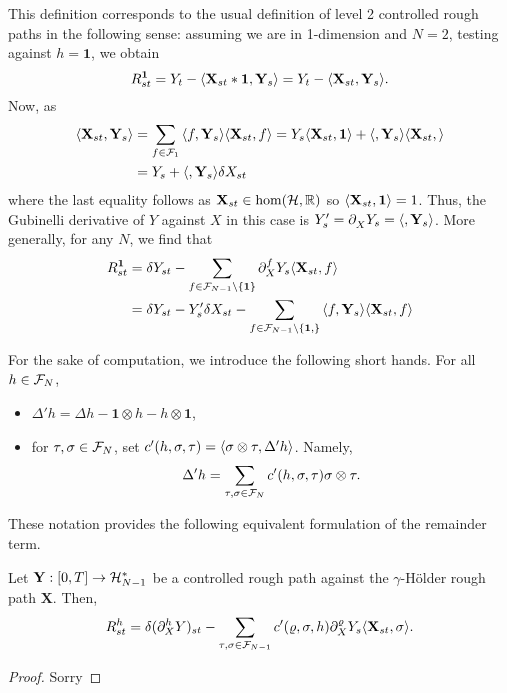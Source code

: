 \documentclass[11pt]{style/preprint}
\begin{document}
This definition corresponds to the usual definition of level 2 controlled rough paths in the following sense: 
assuming we are in 1-dimension and \(N = 2\), testing against \(h = \mathbf{1}\), we obtain
\[R^{\mathbf{1}}_{st} = Y_t - \< \mathbf{X}_{st} * \mathbf{1}, \mathbf{Y}_s\> 
  = Y_t - \< \mathbf{X}_{st}, \mathbf{Y}_s\>.\]
Now, as 
\begin{align*}
  \< \mathbf{X}_{st}, \mathbf{Y}_s\> 
  & = \sum_{f \in \CF_{1}} \< f, \mathbf{Y}_s\> \< \mathbf{X}_{st}, f\>
    = Y_s \< \mathbf{X}_{st}, \mathbf{1}\> 
      + \< \tree<X'>, \mathbf{Y}_s\> \< \mathbf{X}_{st}, \tree<X'>\>\\
  & = Y_s + \< \tree<X'>, \mathbf{Y}_s\> \delta X_{st}
\end{align*}
where the last equality follows as \(\mathbf{X}_{st} \in \hom({\mathcal H}, \mathbb{R})\) so 
\(\< \mathbf{X}_{st}, \mathbf{1}\> = 1\). Thus, the Gubinelli derivative of \(Y\) against 
\(X\) in this case is \(Y'_s = \partial^{\tree<X'>}_X Y_s = \< \tree<X'>, \mathbf{Y}_s\>\). 
More generally, for any \(N\), we find that
\begin{align*}
  R^{\mathbf{1}}_{st} 
  & = \delta Y_{st} - 
  \sum_{f \in \CF_{N - 1} \setminus \{\mathbf{1}\}} \partial_X^f Y_s \< \mathbf{X}_{st}, f\>\\
  & = \delta Y_{st} - Y'_s \delta X_{st} - 
    \sum_{f \in \CF_{N - 1} \setminus \{\mathbf{1}, \tree<X'>\}} \< f, \mathbf{Y}_s\> \< \mathbf{X}_{st}, f\>
\end{align*}

For the sake of computation, we introduce the following short hands. For all \(h \in {\mathcal F}_{N}\), 
\begin{itemize}
  \item \(\Delta' h = \Delta h - \mathbf{1} \otimes h - h \otimes \mathbf{1}\),
  \item for \(\tau, \sigma \in {\mathcal F}_{N}\), set \(c'(h, \sigma, \tau) = \< \sigma \otimes \tau, \Delta' h\>\). 
    Namely, 
    \[\Delta' h = \sum_{\tau, \sigma \in {\mathcal F}_{N}} c'(h, \sigma, \tau) \sigma \otimes \tau.\]
\end{itemize}
These notation provides the following equivalent formulation of the remainder term.
\begin{proposition}
  Let \(\mathbf{Y} : [0, T] \to {\mathcal H}^*_{N - 1}\) be a controlled rough path against the \(\gamma\)-H\"older 
  rough path \(\mathbf{X}\). Then, 
  \[R_{st}^h = \delta (\partial^h_X Y)_{st} - 
    \sum_{\tau, \sigma \in \CF_{N - 1}} c'(\rho, \sigma, h) \partial^\rho_X Y_s \< \mathbf{X}_{st}, \sigma\>.\]
\end{proposition}
\begin{proof}
  Sorry
\end{proof}
\end{document}
